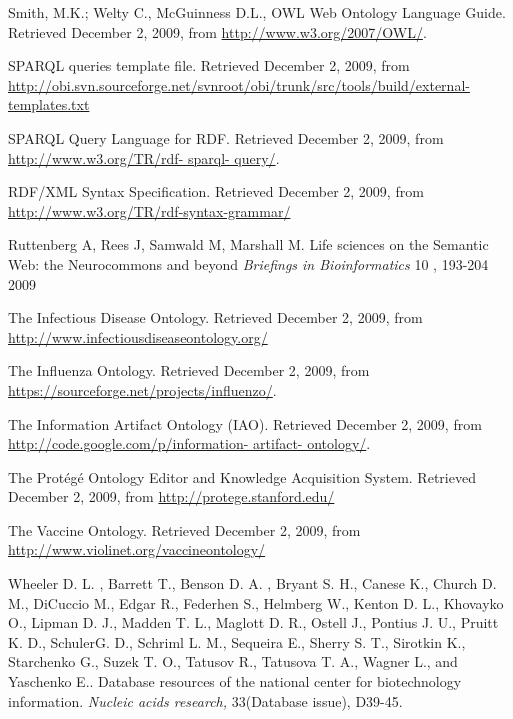 \documentclass[jou]{ao2e}%
\begin{document}
\begin{thebibliography}{}
  Smith, M.K.; Welty C., McGuinness D.L., OWL Web Ontology Language Guide. Retrieved December 2, 2009, from \url{http://www.w3.org/2007/OWL/}.
 
   SPARQL queries template file. Retrieved December 2, 2009, from \url{http://obi.svn.sourceforge.net/svnroot/obi/trunk/src/tools/build/external-templates.txt}
  
  SPARQL Query Language for RDF. Retrieved December 2, 2009, from \url{http://www.w3.org/TR/rdf- sparql- query/}. 
 
  RDF/XML Syntax Specification. Retrieved December 2, 2009, from \url{http://www.w3.org/TR/rdf-syntax-grammar/}
 
  Ruttenberg A, Rees J, Samwald M, Marshall M. Life sciences on the Semantic Web: the Neurocommons and beyond \textit{Briefings in Bioinformatics} 10 , 193-204 2009
 
  The Infectious Disease Ontology. Retrieved December 2, 2009, from \url{http://www.infectiousdiseaseontology.org/}
 
  The Influenza Ontology. Retrieved December 2, 2009, from \url{https://sourceforge.net/projects/influenzo/}.
 
  The Information Artifact Ontology (IAO). Retrieved December 2, 2009, from \url{http://code.google.com/p/information- artifact- ontology/}.
 
  The Prot\'{e}g\'{e} Ontology Editor and Knowledge Acquisition System. Retrieved December 2, 2009, from \url{http://protege.stanford.edu/}
 
  The Vaccine Ontology. Retrieved December 2, 2009, from \url{http://www.violinet.org/vaccineontology/}

Wheeler D. L. , Barrett T., Benson D. A. , Bryant S. H., Canese K., Church D. M., DiCuccio M., Edgar R., Federhen S., 
 Helmberg W., Kenton D. L., Khovayko O., Lipman D. J., Madden T. L., Maglott D. R., Ostell J., Pontius J. U., Pruitt K. D., 
 SchulerG. D., Schriml L. M., Sequeira E., Sherry S. T., Sirotkin K., Starchenko G., Suzek T. O., Tatusov R., Tatusova T. A., 
 Wagner L., and Yaschenko E.. Database resources of the national center for biotechnology information. \textit{Nucleic acids 
research, } 33(Database issue), D39-45.

 
\end{thebibliography}
    
\end{document}
